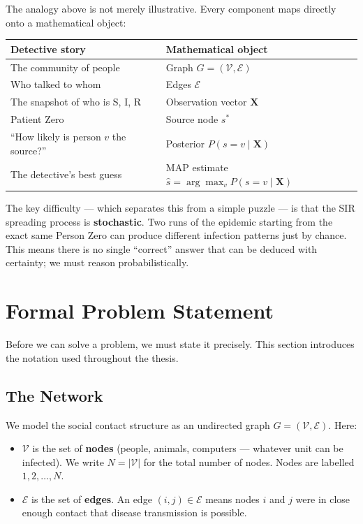The analogy above is not merely illustrative. Every component maps directly
onto a mathematical object:

\begin{center}
\begin{tabular}{ll}
\toprule
\textbf{Detective story} & \textbf{Mathematical object} \\
\midrule
The community of people          & Graph $G = (\mathcal{V}, \mathcal{E})$ \\
Who talked to whom               & Edges $\mathcal{E}$ \\
The snapshot of who is S, I, R   & Observation vector $\mathbf{X}$ \\
Patient Zero                     & Source node $s^*$ \\
``How likely is person $v$ the source?'' & Posterior $P(s = v \mid \mathbf{X})$ \\
The detective's best guess       & MAP estimate $\hat{s} = \arg\max_v P(s=v \mid \mathbf{X})$ \\
\bottomrule
\end{tabular}
\end{center}

The key difficulty — which separates this from a simple puzzle — is that the
SIR spreading process is \textbf{stochastic}. Two runs of the epidemic
starting from the exact same Person Zero can produce different infection
patterns just by chance. This means there is no single ``correct'' answer that
can be deduced with certainty; we must reason probabilistically.

\section{Formal Problem Statement}
\label{sec:formal-problem}

Before we can solve a problem, we must state it precisely. This section
introduces the notation used throughout the thesis.

\subsection{The Network}

We model the social contact structure as an undirected graph
$G = (\mathcal{V}, \mathcal{E})$. Here:

\begin{itemize}
    \item $\mathcal{V}$ is the set of \textbf{nodes} (people, animals, computers
    — whatever unit can be infected). We write $N = |\mathcal{V}|$ for the
    total number of nodes. Nodes are labelled $1, 2, \ldots, N$.
    \item $\mathcal{E}$ is the set of \textbf{edges}. An edge $(i, j) \in
    \mathcal{E}$ means nodes $i$ and $j$ were in close enough contact that
    disease transmission is possible.
\end{itemize}

